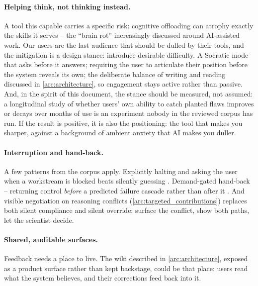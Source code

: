 \paragraph{Helping think, not thinking instead.}
A tool this capable carries a specific risk: cognitive offloading can atrophy exactly the skills it serves -- the ``brain rot'' increasingly discussed around AI-assisted work. Our users are the last audience that should be dulled by their tools, and the mitigation is a design stance: introduce desirable difficulty. A Socratic mode that asks before it answers; requiring the user to articulate their position before the system reveals its own; the deliberate balance of writing and reading discussed in \ref{arc:architecture}, so engagement stays active rather than passive. And, in the spirit of this document, the stance should be measured, not assumed: a longitudinal study of whether users' own ability to catch planted flaws improves or decays over months of use is an experiment nobody in the reviewed corpus has run. If the result is positive, it is also the positioning: the tool that makes you sharper, against a background of ambient anxiety that AI makes you duller.

\paragraph{Interruption and hand-back.}
A few patterns from the corpus apply. Explicitly halting and asking the user when a workstream is blocked beats silently guessing \cite{2605.06651}. Demand-gated hand-back -- returning control \emph{before} a predicted failure cascade rather than after it \cite{Zhou2026}. And visible negotiation on reasoning conflicts (\ref{arc:targeted_contributions}) replaces both silent compliance and silent override: surface the conflict, show both paths, let the scientist decide.

\paragraph{Shared, auditable surfaces.}
Feedback needs a place to live. The wiki described in \ref{arc:architecture}, exposed as a product surface rather than kept backstage, could be that place: users read what the system believes, and their corrections feed back into it.

